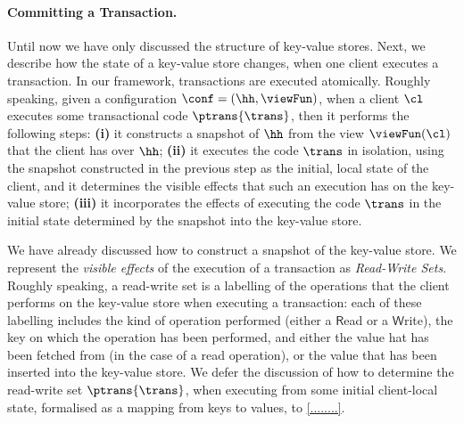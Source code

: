
\paragraph{Committing a Transaction.}
Until now we have only discussed the structure of key-value stores. 
Next, we describe how the state of a key-value store changes, when 
one client executes a transaction. 
In our framework, transactions are executed atomically. 
Roughly speaking, given a configuration $\conf = (\hh, \viewFun)$, 
when a client $\cl$ executes some transactional code $\ptrans{\trans}$, 
then it performs the following steps: 
\textbf{(i)} it constructs a snapshot of $\hh$ from the view $\viewFun(\cl)$ that 
the client has over $\hh$; \textbf{(ii)} it executes the code $\trans$ in isolation, using the 
snapshot constructed in the previous step as the initial, local state of the client, and it determines the visible 
effects that such an execution has on the key-value store; \textbf{(iii)} it incorporates 
the effects of executing the code $\trans$ in the initial state determined by the snapshot into 
the key-value store.

We have already discussed how to construct a snapshot of the key-value store. 
We represent the \emph{visible effects} of the execution of a transaction as \emph{Read-Write Sets}. 
Roughly speaking, a read-write set is a labelling of the operations that the client performs on  
the key-value store when executing a transaction: each of these labelling includes the kind of 
operation performed (either a $\mathsf{R}$ead or a $\mathsf{W}$rite), 
the key on which the operation has been performed, and either the value hat has been fetched from 
(in the case of a read operation), or the value that has been inserted into the key-value store.
We defer the discussion of how to determine the read-write set $\ptrans{\trans}$, 
when executing from some initial client-local state, formalised as a mapping from keys to values, to 
\cref{........}. 

